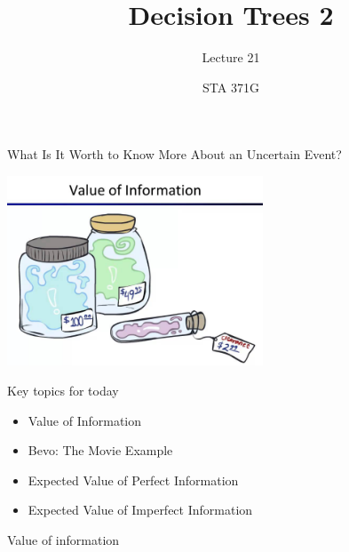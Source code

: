\documentclass{beamer}\usepackage[]{graphicx}\usepackage[]{color}
\title{Decision Trees 2}
\subtitle{Lecture 21}
\author{STA 371G}
\begin{document}
  
  

  \frame{\maketitle}



  \begin{darkframes}
    

    \begin{frame}{What Is It Worth to Know More About an Uncertain Event?}
      \fontsize{10}{10}\selectfont
     \begin{center}
      \includegraphics[width=3in]{ValueOfInformation.png} 
      \end{center}

    \lc %
      
    \end{frame}

    \begin{frame}{Key topics for today}
        \begin{itemize}[<+->]
            \item Value of Information
            \item Bevo: The Movie Example
            \item Expected Value of Perfect Information
            \item Expected Value of Imperfect Information
        \end{itemize}
      
    \end{frame}


    \begin{frame}[fragile]{Value of information}


\end{frame}
\end{darkframes}
\end{document}
